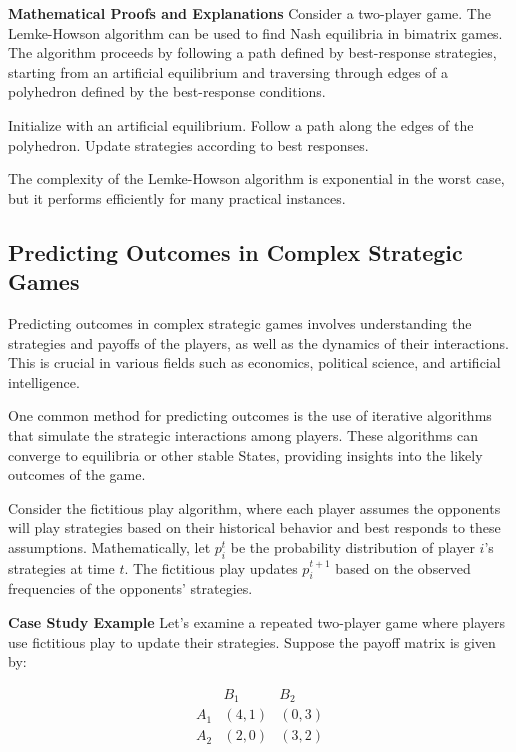 \documentclass[12pt]{book} %
\begin{document}
\textbf{Mathematical Proofs and Explanations}
Consider a two-player game. The Lemke-Howson algorithm can be used to find Nash equilibria in bimatrix games. The algorithm proceeds by following a path defined by best-response strategies, starting from an artificial equilibrium and traversing through edges of a polyhedron defined by the best-response conditions.
\FloatBarrier
\begin{algorithm}[H]
\caption{Lemke-Howson Algorithm for Bimatrix Games}
\begin{algorithmic}[1]
\State Initialize with an artificial equilibrium.
\Repeat
    \State Follow a path along the edges of the polyhedron.
    \State Update strategies according to best responses.
\end{algorithmic}
\end{algorithm}
\FloatBarrier
The complexity of the Lemke-Howson algorithm is exponential in the worst case, but it performs efficiently for many practical instances.

\subsection{Predicting Outcomes in Complex Strategic Games}
Predicting outcomes in complex strategic games involves understanding the strategies and payoffs of the players, as well as the dynamics of their interactions. This is crucial in various fields such as economics, political science, and artificial intelligence.

One common method for predicting outcomes is the use of iterative algorithms that simulate the strategic interactions among players. These algorithms can converge to equilibria or other stable States, providing insights into the likely outcomes of the game.

Consider the fictitious play algorithm, where each player assumes the opponents will play strategies based on their historical behavior and best responds to these assumptions. Mathematically, let $p_i^t$ be the probability distribution of player $i$'s strategies at time $t$. The fictitious play updates $p_i^{t+1}$ based on the observed frequencies of the opponents' strategies.

\textbf{Case Study Example}
Let's examine a repeated two-player game where players use fictitious play to update their strategies. Suppose the payoff matrix is given by:

\[
\begin{array}{c|cc}
 & B_1 & B_2 \\
\hline
A_1 & (4, 1) & (0, 3) \\
A_2 & (2, 0) & (3, 2) \\
\end{array}
\]
\end{document}
